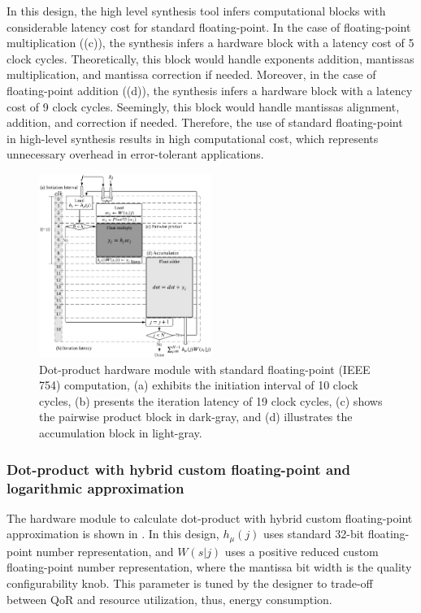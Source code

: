 In this design, the high level synthesis tool infers computational blocks with considerable latency cost for standard floating-point. In the case of floating-point multiplication ((c)), the synthesis infers a hardware block with a latency cost of 5 clock cycles. Theoretically, this block would handle exponents addition, mantissas multiplication, and mantissa correction if needed. Moreover, in the case of floating-point addition ((d)), the synthesis infers a hardware block with a latency cost of 9 clock cycles. Seemingly, this block would handle mantissas alignment, addition, and correction if needed. Therefore, the use of standard floating-point in high-level synthesis results in high computational cost, which represents unnecessary overhead in error-tolerant applications.


\begin{figure}[t!]
	\centering
	\includegraphics[width=0.5\textwidth]{../figures/dot_product_float.pdf}
	\caption{Dot-product hardware module with standard floating-point (IEEE 754) computation, (a) exhibits the initiation interval of 10 clock cycles, (b) presents the iteration latency of 19 clock cycles, (c) shows the pairwise product block in dark-gray, and (d) illustrates the accumulation block in light-gray.}
	\label{fig:dot_product_float}
\end{figure}

\subsubsection{Dot-product with hybrid custom floating-point and logarithmic approximation}
 The hardware module to calculate dot-product with hybrid custom floating-point approximation is shown in . In this design, $h_\mu(j)$ uses standard 32-bit floating-point number representation, and $W(s|j)$ uses a positive reduced custom floating-point number representation, where the mantissa bit width is the quality configurability knob. This parameter is tuned by the designer to trade-off between QoR and resource utilization, thus, energy consumption.
 
